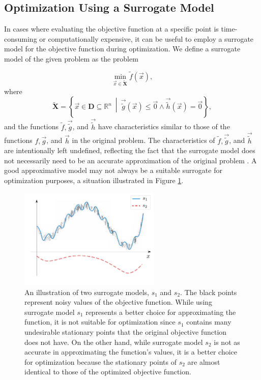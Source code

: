 \subsection{Optimization Using a Surrogate Model}\label{model-based}
In cases where evaluating the objective function at a specific point is time-consuming or computationally expensive, it can be useful to employ a surrogate model for the objective function during optimization. We define a surrogate model of the given problem as the problem

\begin{equation}
	\min_{\vec{x} \in \mathbf{\tilde{X}}} \tilde{f}(\vec{x}),
\end{equation}
where
\begin{equation}
	\mathbf{\tilde{X}} = \left\{ \vec{x} \in \mathbf{D} \subseteq \mathbb{R}^n \ \middle| \ \vec{\tilde{g}} (\vec{x}) \leq \vec{0} \wedge \vec{\tilde{h}} (\vec{x}) = \vec{0} \right\},
\end{equation}
and the functions \( \tilde{f}, \vec{\tilde{g}} \), and \( \vec{\tilde{h}} \) have characteristics similar to those of the functions \( f, \vec{g} \), and \( \vec{h} \) in the original problem. The characteristics of \( \tilde{f}, \vec{\tilde{g}} \), and \( \vec{\tilde{h}} \) are intentionally left undefined, reflecting the fact that the surrogate model does not necessarily need to be an accurate approximation of the original problem \cite{BBO-textbook, two-decades, Kramer2011}. A good approximative model may not always be a suitable surrogate for optimization purposes, a situation illustrated in Figure \ref{fig:surrogate}.

\begin{figure}[H]
	\centering
	\includegraphics[width=0.6\textwidth]{figures/surrogate.pdf}
	\caption{An illustration of two surrogate models, $ s_1 $ and $ s_2 $. The black points represent noisy values of the objective function. While using surrogate model $ s_1 $ represents a better choice for approximating the function, it is not suitable for optimization since $ s_1 $ contains many undesirable stationary points that the original objective function does not have. On the other hand, while surrogate model $ s_2 $ is not as accurate in approximating the function's values, it is a better choice for optimization because the stationary points of $ s_2 $ are almost identical to those of the optimized objective function.}
	\label{fig:surrogate}
\end{figure}

